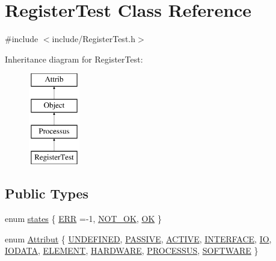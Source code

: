 \hypertarget{classRegisterTest}{}\section{Register\+Test Class Reference}
\label{classRegisterTest}


{\ttfamily \#include $<$include/\+Register\+Test.\+h$>$}

Inheritance diagram for Register\+Test\+:\begin{figure}[H]
\begin{center}
\leavevmode
\includegraphics[height=4.000000cm]{classRegisterTest}
\end{center}
\end{figure}
\subsection*{Public Types}
\begin{DoxyCompactItemize}
\item 
enum \hyperlink{classProcessus_a36278773bd98f2d5612fea40c7774821}{states} \{ \hyperlink{classProcessus_a36278773bd98f2d5612fea40c7774821adaf73ad5d0a09f952d0f18dbbe1c7493}{E\+RR} =-\/1, 
\hyperlink{classProcessus_a36278773bd98f2d5612fea40c7774821a629082f49d6e8df6b6da2b8fbb9d80fb}{N\+O\+T\+\_\+\+OK}, 
\hyperlink{classProcessus_a36278773bd98f2d5612fea40c7774821af77c64124fa175f28200166fff165ea2}{OK}
 \}
\item 
enum \hyperlink{classAttrib_a69e171d7cc6417835a5a306d3c764235}{Attribut} \{ \newline
\hyperlink{classAttrib_a69e171d7cc6417835a5a306d3c764235a3a8da2ab97dda18aebab196fe4100531}{U\+N\+D\+E\+F\+I\+N\+ED}, 
\hyperlink{classAttrib_a69e171d7cc6417835a5a306d3c764235a2bfb2af57b87031d190a05fe25dd92ed}{P\+A\+S\+S\+I\+VE}, 
\hyperlink{classAttrib_a69e171d7cc6417835a5a306d3c764235a3b1fec929c0370d1436f2f06e298fb0d}{A\+C\+T\+I\+VE}, 
\hyperlink{classAttrib_a69e171d7cc6417835a5a306d3c764235aa27c16b480a369ea4d18b07b2516bbc7}{I\+N\+T\+E\+R\+F\+A\+CE}, 
\newline
\hyperlink{classAttrib_a69e171d7cc6417835a5a306d3c764235a1420a5b8c0540b2af210b6975eded7f9}{IO}, 
\hyperlink{classAttrib_a69e171d7cc6417835a5a306d3c764235a0af3b0d0ac323c1704e6c69cf90add28}{I\+O\+D\+A\+TA}, 
\hyperlink{classAttrib_a69e171d7cc6417835a5a306d3c764235a7788bc5dd333fd8ce18562b269c9dab1}{E\+L\+E\+M\+E\+NT}, 
\hyperlink{classAttrib_a69e171d7cc6417835a5a306d3c764235a61ceb22149f365f1780d18f9d1459423}{H\+A\+R\+D\+W\+A\+RE}, 
\newline
\hyperlink{classAttrib_a69e171d7cc6417835a5a306d3c764235a75250e29692496e73effca2c0330977f}{P\+R\+O\+C\+E\+S\+S\+US}, 
\hyperlink{classAttrib_a69e171d7cc6417835a5a306d3c764235a103a67cd0b8f07ef478fa45d4356e27b}{S\+O\+F\+T\+W\+A\+RE}
 \}
\end{DoxyCompactItemize}
